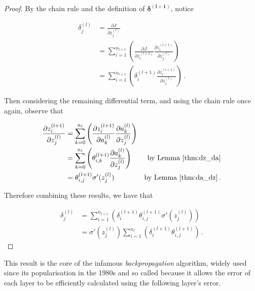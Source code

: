 \documentclass{article}[11pt]
\begin{document}
        \begin{proof}
            
            By the chain rule and the definition of $\boldsymbol{\delta^{(l+1)}}$, notice
            
            $$ \begin{aligned}
            \delta^{(l)}_j
            &= \frac{\partial J}{\partial z^{(l)}_j} \\
            &= \sum_{i=1}^{n_{l+1}} \left( \frac{\partial J}{\partial z^{(l+1)}_i} \frac{\partial z^{(l+1)}_i}{\partial z^{(l)}_j} \right) \\
            &= \sum_{i=1}^{n_{l+1}} \left( \delta^{(l+1)}_i \frac{\partial z^{(l+1)}_i}{\partial z^{(l)}_j} \right) \,.
            \end{aligned} $$
            
            Then considering the remaining differential term, and using the chain rule once again, observe that
            
            $$ \begin{aligned}
            \frac{\partial z^{(l+1)}_i}{\partial z^{(l)}_j}
            &= \sum_{k=0}^{n_l} \left( \frac{\partial z^{(l+1)}_i}{\partial a^{(l)}_k} \frac{\partial a^{(l)}_k}{\partial z^{(l)}_j} \right) \\
            &= \sum_{k=0}^{n_l} \left( \theta^{(l+1)}_{i,k} \frac{\partial a^{(l)}_k}{\partial z^{(l)}_j} \right) & \text{by Lemma \ref{thm:dz_da}} \\
            &= \theta^{(l+1)}_{i,j} \sigma'(z^{(l)}_j) & \text{by Lemma \ref{thm:da_dz}} \,.
            \end{aligned} $$
            
            Therefore combining these results, we have that
            
            $$ \begin{aligned}
            \delta^{(l)}_j
            &= \sum_{i=1}^{n_{l+1}} \left( \delta^{(l+1)}_i \theta^{(l+1)}_{i,j} \sigma'(z^{(l)}_j) \right) \\
            &= \sigma'(z^{(l)}_j) \sum_{i=1}^{n_l} \left( \delta^{(l+1)}_i \theta^{(l+1)}_{i,j} \right) \,.
            \end{aligned} $$
            
        \end{proof}
    
    
        This result is the core of the infamous \textit{backpropagation} algorithm, widely used since its popularisation in the 1980s \cite{hinton_backprop} and so called because it allows the error of each layer to be efficiently calculated using the following layer's error.
        
\end{document}
